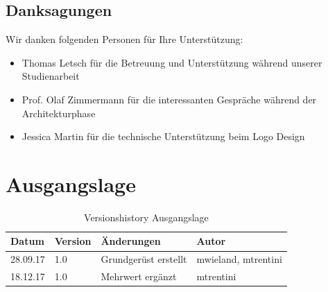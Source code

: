 \documentclass[11pt,a4paper,english,oneside]{book}
\numberwithin{equation}{chapter}
\begin{document}
	
	\newpage
	
	\section*{Danksagungen}
	\thispagestyle{firststyle}
	
	Wir danken folgenden Personen für Ihre Unterstützung:
	
	\begin{itemize}
		\item Thomas Letsch für die Betreuung und Unterstützung während unserer Studienarbeit
		\item Prof. Olaf Zimmermann für die interessanten Gespräche während der Architekturphase
		\item Jessica Martin für die technische Unterstützung beim Logo Design
	\end{itemize}
	

	{
		\hypersetup{linkcolor=black}
		\tableofcontents
	}

	\newpage
	
	
	\chapter{Ausgangslage}
	
	\begin{table}[h!]
		\centering
		\begin{tabularx}{\linewidth}{l l X l}
			\toprule 
			Datum & Version & Änderungen & Autor \\
			\midrule
			28.09.17 & 1.0 & Grundgerüst erstellt & mwieland, mtrentini \\
			18.12.17 & 1.0 & Mehrwert ergänzt & mtrentini \\
			\bottomrule 
		\end{tabularx} 
		\caption{Versionshistory Ausgangslage} 
	\end{table}
	
	
\end{document}
